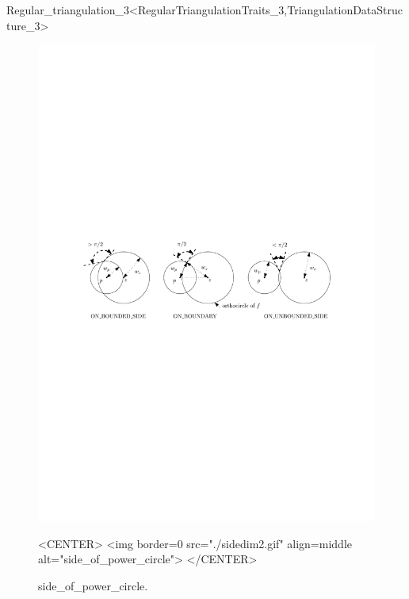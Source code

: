 \begin{ccRefClass}{Regular_triangulation_3<RegularTriangulationTraits_3,TriangulationDataStructure_3>}
\begin{figure}[htbp]
\begin{ccTexOnly}
\begin{center} 
\includegraphics{Triangulation_3_ref/sidedim2} 
\end{center}
\end{ccTexOnly}
\caption{side\_of\_power\_circle.
\label{Triangulation3-fig-sidedim2}}
\begin{ccHtmlOnly}
<CENTER>
<img border=0 src="./sidedim2.gif" align=middle alt="side_of_power_circle"> 
</CENTER>
\end{ccHtmlOnly}
\end{figure} 


\end{ccRefClass}
